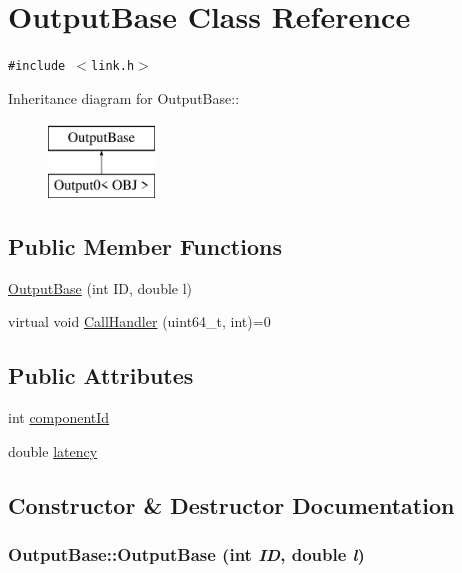 \hypertarget{classOutputBase}{
\section{OutputBase Class Reference}
\label{classOutputBase}
}
{\tt \#include $<$link.h$>$}

Inheritance diagram for OutputBase::\begin{figure}[H]
\begin{center}
\leavevmode
\includegraphics[height=2cm]{classOutputBase}
\end{center}
\end{figure}
\subsection*{Public Member Functions}
\begin{CompactItemize}
\item 
\hyperlink{classOutputBase_4fff2d392d52f721a8d57c51aa1ac852}{OutputBase} (int ID, double l)
\item 
virtual void \hyperlink{classOutputBase_2d7b62cb9883958534b55b7bfa391394}{CallHandler} (uint64\_\-t, int)=0
\end{CompactItemize}
\subsection*{Public Attributes}
\begin{CompactItemize}
\item 
int \hyperlink{classOutputBase_93729601fb94bd561cb16ea2601d5528}{componentId}
\item 
double \hyperlink{classOutputBase_d2e8f2c3509a16cc1ae79f1f3f89ab27}{latency}
\end{CompactItemize}


\subsection{Constructor \& Destructor Documentation}
\hypertarget{classOutputBase_4fff2d392d52f721a8d57c51aa1ac852}{
\subsubsection[{OutputBase}]{\setlength{\rightskip}{0pt plus 5cm}OutputBase::OutputBase (int {\em ID}, \/  double {\em l})}}
\label{classOutputBase_4fff2d392d52f721a8d57c51aa1ac852}




